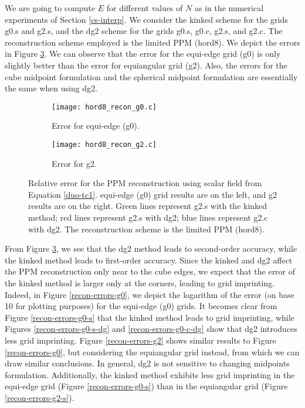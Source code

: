 We are going to compute $E$ for different values of $N$ as in the numerical experiments of Section \ref{cs-interp}.
We consider the kinked scheme for the grids g0.s and g2.s, and the dg2 scheme for the grids g0.s, g0.c, g2.s, and g2.c.
The reconstruction scheme employed is the limited PPM (hord8). We depict the errors in Figure \ref{cs-recon-error}.
We can observe that the error for the equi-edge grid (g0) is only slightly better than the error for equiangular grid (g2).
Also, the errors for the cube midpoint formulation and the spherical midpoint formulation are essentially the same when using dg2.
\begin{figure}[!htb]
	\centering
	\begin{subfigure}{0.45\textwidth}
		\centering
		\texttt{[image: hord8\_recon\_g0.c]}
		\caption{Error for equi-edge (g0).\label{cs-recon-g0}}
	\end{subfigure}
	\begin{subfigure}{0.45\textwidth}
		\centering
		\texttt{[image: hord8\_recon\_g2.c]}
		\caption{Error for g2.\label{cs-recon-g2}}
	\end{subfigure}
	\caption{Relative error for the PPM reconstruction using scalar field from Equation \eqref{duo-tc1}.
	equi-edge (g0) grid results are on the left, and g2 results are on the right.
	Green lines represent g2.s with the kinked method;
	red lines represent g2.s with dg2;
	blue lines represent g2.c with dg2.
	The reconstruction scheme is the limited PPM (hord8).\label{cs-recon-error}}
\end{figure}

From Figure \ref{cs-recon-error}, we see that the dg2 method leads to second-order accuracy, while the kinked method leads to first-order accuracy.
Since the kinked and dg2 affect the PPM reconstruction only near to the cube edges, we expect that the error of the kinked  method is larger only at the corners, leading to grid imprinting.
Indeed, in Figure \ref{recon-errors-g0}, we depict the logarithm of the error (on base 10 for plotting purposes) for the equi-edge (g0) grids.
It becomes clear from Figure \ref{recon-errors-g0-s} that the kinked method leads to grid imprinting,
while Figures \ref{recon-errors-g0-s-dg} and \ref{recon-errors-g0-c-dg} show that dg2 introduces less grid imprinting.
Figure \ref{recon-errors-g2} shows similar results to Figure \ref{recon-errors-g0}, but considering the equiangular grid instead, from which we can draw similar conclusions.
In general, dg2 is not sensitive to changing midpoints formulation.
Additionally, the kinked method exhibits less grid imprinting in the equi-edge grid (Figure \ref{recon-errors-g0-s}) than in the equiangular grid (Figure \ref{recon-errors-g2-s}).

